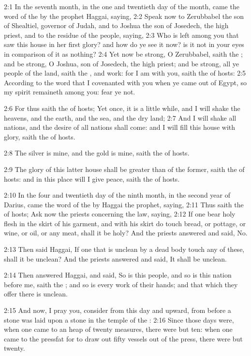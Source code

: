 2:1 In the seventh month, in the one and twentieth day of the month, came the word of the \LORD by the prophet Haggai, saying, 2:2 Speak now to Zerubbabel the son of Shealtiel, governor of Judah, and to Joshua the son of Josedech, the high priest, and to the residue of the people, saying, 2:3 Who is left among you that saw this house in her first glory? and how do ye see it now? is it not in your eyes in comparison of it as nothing?  2:4 Yet now be strong, O Zerubbabel, saith the \LORD; and be strong, O Joshua, son of Josedech, the high priest; and be strong, all ye people of the land, saith the \LORD, and work: for I am with you, saith the \LORD of hosts: 2:5 According to the word that I covenanted with you when ye came out of Egypt, so my spirit remaineth among you: fear ye not.

2:6 For thus saith the \LORD of hosts; Yet once, it is a little while, and I will shake the heavens, and the earth, and the sea, and the dry land; 2:7 And I will shake all nations, and the desire of all nations shall come: and I will fill this house with glory, saith the \LORD of hosts.

2:8 The silver is mine, and the gold is mine, saith the \LORD of hosts.

2:9 The glory of this latter house shall be greater than of the former, saith the \LORD of hosts: and in this place will I give peace, saith the \LORD of hosts.

2:10 In the four and twentieth day of the ninth month, in the second year of Darius, came the word of the \LORD by Haggai the prophet, saying, 2:11 Thus saith the \LORD of hosts; Ask now the priests concerning the law, saying, 2:12 If one bear holy flesh in the skirt of his garment, and with his skirt do touch bread, or pottage, or wine, or oil, or any meat, shall it be holy? And the priests answered and said, No.

2:13 Then said Haggai, If one that is unclean by a dead body touch any of these, shall it be unclean? And the priests answered and said, It shall be unclean.

2:14 Then answered Haggai, and said, So is this people, and so is this nation before me, saith the \LORD; and so is every work of their hands; and that which they offer there is unclean.

2:15 And now, I pray you, consider from this day and upward, from before a stone was laid upon a stone in the temple of the \LORD: 2:16 Since those days were, when one came to an heap of twenty measures, there were but ten: when one came to the pressfat for to draw out fifty vessels out of the press, there were but twenty.

